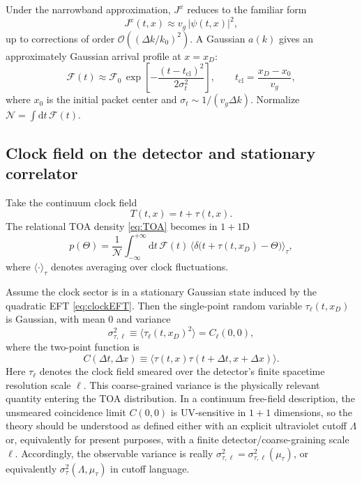\documentclass[11pt, a4paper]{article}
\theoremstyle{definition}
\theoremstyle{plain}
\theoremstyle{remark}
\numberwithin{equation}{section}
\newcommand{\dd}{\mathrm{d}}
\newcommand{\F}{\mathcal{F}}
\newcommand{\cO}{\mathcal{O}}
\begin{document}
        Under the narrowband approximation, $J^x$ reduces to the familiar form
        \begin{equation}
            J^x(t,x)\approx v_g\,|\psi(t,x)|^2,
            \label{eq:Japprox}
        \end{equation}
        up to corrections of order $\cO((\Delta k/k_0)^2)$. A Gaussian $a(k)$ gives an approximately Gaussian arrival profile at $x=x_D$:
        \begin{equation}
            \F(t)\approx \F_0\,\exp\!\left[-\frac{(t-t_{\mathrm{cl}})^2}{2\sigma_t^2}\right],
            \qquad
            t_{\mathrm{cl}}=\frac{x_D-x_0}{v_g},
            \label{eq:fluxGaussian}
        \end{equation}
        where $x_0$ is the initial packet center and $\sigma_t\sim 1/(v_g\Delta k)$. Normalize $\mathcal{N}=\int \dd t\,\F(t)$.
    
    \subsection{Clock field on the detector and stationary correlator}
        
        Take the continuum clock field
        \begin{equation}
            T(t,x)=t+\tau(t,x).
        \end{equation}
        The relational TOA density \eqref{eq:TOA} becomes in $1+1$D
        \begin{equation}
            p(\Theta)=\frac{1}{\mathcal{N}}\int_{-\infty}^{+\infty}\dd t\,
            \F(t)\,
            \Big\langle \delta\!\big(t+\tau(t,x_D)-\Theta\big)\Big\rangle_{\tau},
            \label{eq:pThetaAvg}
        \end{equation}
        where $\langle\cdot\rangle_\tau$ denotes averaging over clock fluctuations.
        
        Assume the clock sector is in a stationary Gaussian state induced by the quadratic EFT \eqref{eq:clockEFT}. Then the single-point random variable $\tau_\ell(t,x_D)$ is Gaussian, with mean $0$ and variance
        \begin{equation}
            \sigma_{\tau,\ell}^2 \equiv \langle \tau_\ell(t,x_D)^2\rangle = C_\ell(0,0),
        \end{equation}
        where the two-point function is
        \begin{equation}
            C(\Delta t,\Delta x)\equiv \langle \tau(t,x)\tau(t+\Delta t,x+\Delta x)\rangle .
        \end{equation}
        Here $\tau_\ell$ denotes the clock field smeared over the detector's finite spacetime resolution scale $\ell$. This coarse-grained variance is the physically relevant quantity entering the TOA distribution. In a continuum free-field description, the unsmeared coincidence limit $C(0,0)$ is UV-sensitive in $1+1$ dimensions, so the theory should be understood as defined either with an explicit ultraviolet cutoff $\Lambda$ or, equivalently for present purposes, with a finite detector/coarse-graining scale $\ell$. Accordingly, the observable variance is really $\sigma_{\tau,\ell}^2=\sigma_{\tau,\ell}^2(\mu_\tau)$, or equivalently $\sigma_\tau^2(\Lambda,\mu_\tau)$ in cutoff language.
        
\end{document}
